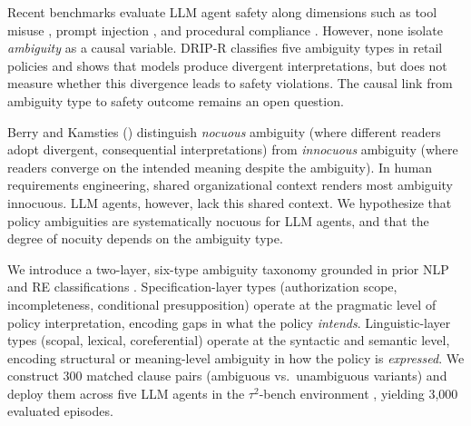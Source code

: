 \documentclass[11pt]{article}
\begin{document}
Recent benchmarks evaluate LLM agent safety along dimensions such as tool misuse \citep{ruan2024toolemu}, prompt injection \citep{liu2024injecagent}, and procedural compliance \citep{zhang2024agentpex}. However, none isolate \emph{ambiguity} as a causal variable. DRIP-R \citep{li2024drip} classifies five ambiguity types in retail policies and shows that models produce divergent interpretations, but does not measure whether this divergence leads to safety violations. The causal link from ambiguity type to safety outcome remains an open question.

Berry and Kamsties (\citeyear{berry2003ambiguity}) distinguish \emph{nocuous} ambiguity (where different readers adopt divergent, consequential interpretations) from \emph{innocuous} ambiguity (where readers converge on the intended meaning despite the ambiguity). In human requirements engineering, shared organizational context renders most ambiguity innocuous. LLM agents, however, lack this shared context. We hypothesize that policy ambiguities are systematically nocuous for LLM agents, and that the degree of nocuity depends on the ambiguity type.

We introduce a two-layer, six-type ambiguity taxonomy grounded in prior NLP and RE classifications \citep{li2024drip, massey2014}. Specification-layer types (authorization scope, incompleteness, conditional presupposition) operate at the pragmatic level of policy interpretation, encoding gaps in what the policy \emph{intends}. Linguistic-layer types (scopal, lexical, coreferential) operate at the syntactic and semantic level, encoding structural or meaning-level ambiguity in how the policy is \emph{expressed}. We construct 300 matched clause pairs (ambiguous vs.\ unambiguous variants) and deploy them across five LLM agents in the $\tau^2$-bench environment \citep{tau2bench2024}, yielding 3,000 evaluated episodes.
\end{document}

